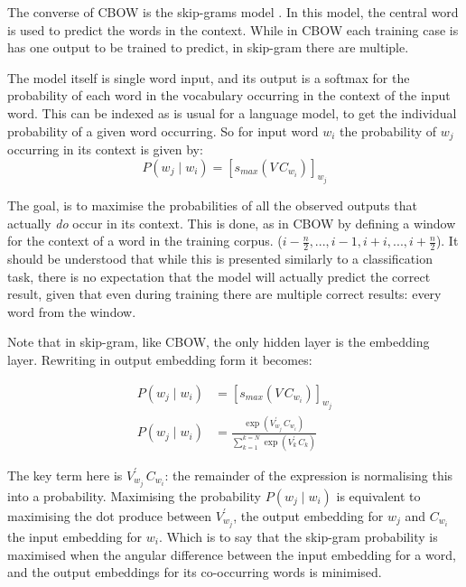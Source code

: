 \documentclass[parskip]{komatufte}
\begin{document}


The converse of CBOW is the skip-grams model .
In this model, the central word is used to predict the words in the context.
While in CBOW each training case is has one output to be trained to predict, in skip-gram there are multiple.

The model itself is single word input, and its output is a softmax for the probability of each word in the vocabulary occurring in the context of the input word.
This can be indexed as is usual for a language model, to get the individual probability of a given word occurring.
So for input word $w_i$ the probability of $w_j$ occurring in its context is given by:
\begin{equation}
P(w_j \mid w_{i}) = \left[s_{max}(V\,C_{w_{i}}) \right]_{w_j} \label{equ:skipgram}
\end{equation}


The goal, is to maximise the probabilities of all the observed outputs that actually \emph{do} occur in its context.
This is done, as in CBOW by defining a window for the context of a word in the training corpus. ($i-\frac{n}{2},...,i-1, i+i,...,i+\frac{n}{2}$).
It should be understood that while this is presented similarly to a classification task,
there is no expectation that the model will actually predict the correct result,
given that even during training there are multiple correct results: every word from the window.


Note that in skip-gram, like CBOW, the only hidden layer is the embedding layer.
Rewriting  in output embedding form it becomes:

\begin{align}
P(w_j \mid w_{i}) & = \left[ s_{max}(V\,C_{w_{i}}) \right]_{w_j} \\
P(w_j \mid w_{i}) & = \frac{\exp(V_{w_j}^\prime\,C_{w_{i}})}{\sum_{k=1}^{k=N} \exp(V_k^\prime\,C_{k})}
\end{align}

The key term here is  $V_{w_j}^\prime\,C_{w_{i}}$:
the remainder of the expression is normalising this into a probability.
Maximising the probability $P(w_j \mid w_{i})$ is equivalent to maximising the dot produce between $V_{w_j}^\prime$, the output embedding for $w_j$ and  $C_{w_i}$ the input embedding for $w_i$.
Which is to say that the skip-gram probability is maximised when the angular difference between the input embedding for a word, and the output embeddings for its co-occurring words is minimised.
\end{document}
